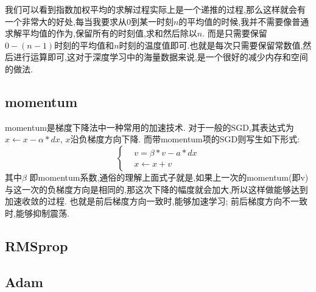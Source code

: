 我们可以看到指数加权平均的求解过程实际上是一个递推的过程,那么这样就会有一个非常大的好处,每当我要求从$0$到某一时刻$n$的平均值的时候,我并不需要像普通求解平均值的作为,保留所有的时刻值,求和然后除以$n$.
而是只需要保留$0 - (n-1)$时刻的平均值和$n$时刻的温度值即可.也就是每次只需要保留常数值,然后进行运算即可,这对于深度学习中的海量数据来说,是一个很好的减少内存和空间的做法.

\subsection{momentum}
momentum是梯度下降法中一种常用的加速技术.
对于一般的SGD,其表达式为$x \leftarrow  x-\alpha \ast dx$, $x$沿负梯度方向下降.
而带momentum项的SGD则写生如下形式:
$$
\left\{
\begin{aligned}
	& v = \beta \ast v - a \ast dx \\
	& x \leftarrow x + v
\end{aligned}
\right.
$$
其中$\beta$ 即momentum系数,通俗的理解上面式子就是,如果上一次的momentum(即v)与这一次的负梯度方向是相同的,那这次下降的幅度就会加大,所以这样做能够达到加速收敛的过程.
也就是前后梯度方向一致时,能够加速学习; 前后梯度方向不一致时,能够抑制震荡.

\subsection{RMSprop}

\subsection{Adam}

